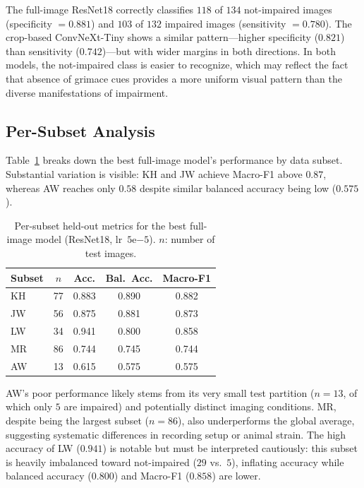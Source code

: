 \documentclass[sigconf]{acmart}
\begin{document}
The full-image ResNet18 correctly classifies $118$ of $134$ not-impaired
images (specificity $=0.881$) and $103$ of $132$ impaired images (sensitivity
$=0.780$). The crop-based ConvNeXt-Tiny shows a similar pattern---higher
specificity ($0.821$) than sensitivity ($0.742$)---but with wider margins in
both directions. In both models, the not-impaired class is easier to
recognize, which may reflect the fact that absence of grimace cues provides a
more uniform visual pattern than the diverse manifestations of impairment.

\subsection{Per-Subset Analysis}
\label{subsec:subset}

Table~\ref{tab:subset} breaks down the best full-image model's performance by
data subset. Substantial variation is visible: KH and JW achieve Macro-F1
above $0.87$, whereas AW reaches only $0.58$ despite similar balanced accuracy
being low ($0.575$).

\begin{table}[t]
  \centering
  \caption{Per-subset held-out metrics for the best full-image model (ResNet18,
  lr~$5\mathrm{e}{-5}$). $n$: number of test images.}
  \label{tab:subset}
  \small
  \begin{tabular}{lcccc}
    \toprule
    Subset & $n$ & Acc. & Bal.\ Acc. & Macro-F1 \\
    \midrule
    KH & 77 & 0.883 & 0.890 & 0.882 \\
    JW & 56 & 0.875 & 0.881 & 0.873 \\
    LW & 34 & 0.941 & 0.800 & 0.858 \\
    MR & 86 & 0.744 & 0.745 & 0.744 \\
    AW & 13 & 0.615 & 0.575 & 0.575 \\
    \bottomrule
  \end{tabular}
\end{table}

AW's poor performance likely stems from its very small test partition ($n=13$,
of which only $5$ are impaired) and potentially distinct imaging conditions.
MR, despite being the largest subset ($n=86$), also underperforms the global
average, suggesting systematic differences in recording setup or animal
strain. The high accuracy of LW ($0.941$) is notable but must be interpreted
cautiously: this subset is heavily imbalanced toward not-impaired ($29$ vs.\
$5$), inflating accuracy while balanced accuracy ($0.800$) and Macro-F1
($0.858$) are lower.
\end{document}
